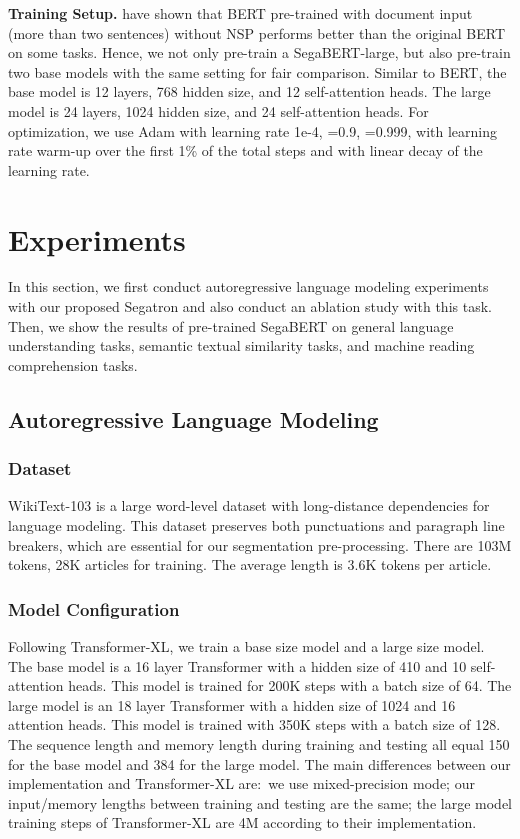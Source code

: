 \documentclass[letterpaper]{article}
\begin{document}
\smallskip\noindent\textbf{Training Setup.}
\citet{DBLP:journals/corr/abs-1907-11692} have shown that BERT pre-trained with document input (more than two sentences) without NSP performs better than the original BERT on some tasks.
Hence, we not only pre-train a SegaBERT-large, but also pre-train two base models with the same setting for fair comparison.
Similar to BERT, the base model is 12 layers, 768 hidden size, and 12 self-attention heads. The large model is 24 layers, 1024 hidden size, and 24 self-attention heads. 
For optimization, we use Adam with learning rate 1e-4, =0.9, =0.999, with learning rate warm-up over the first 1\% of the total steps and with linear decay of the learning rate. 

 \section{Experiments}
In this section, we first conduct autoregressive language modeling experiments with our proposed Segatron and also conduct an ablation study with this task.
Then, we show the results of pre-trained SegaBERT on general language understanding tasks, semantic textual similarity tasks, and machine reading comprehension tasks.

\subsection{Autoregressive Language Modeling}

\subsubsection{Dataset}
WikiText-103 is a large word-level dataset with long-distance dependencies for language modeling. 
This dataset preserves both punctuations and paragraph line breakers, which are essential for our segmentation pre-processing.
There are 103M tokens, 28K articles for training. 
The average length is 3.6K tokens per article. 

\subsubsection{Model Configuration}
Following Transformer-XL, we train a base size model and a large size model.
The base model is a 16 layer Transformer with a hidden size of 410 and 10 self-attention heads. This model is trained for 200K steps with a batch size of 64. 
The large model is an 18 layer Transformer with a hidden size of 1024 and 16 attention heads. 
This model is trained with 350K steps with a batch size of 128. 
The sequence length and memory length during training and testing all equal 150 for the base model and 384 for the large model. 
The main differences between our implementation and Transformer-XL are:\ we use mixed-precision mode; our input/memory lengths between training and testing are the same; the large model training steps of Transformer-XL are 4M according to their implementation.
\end{document}
